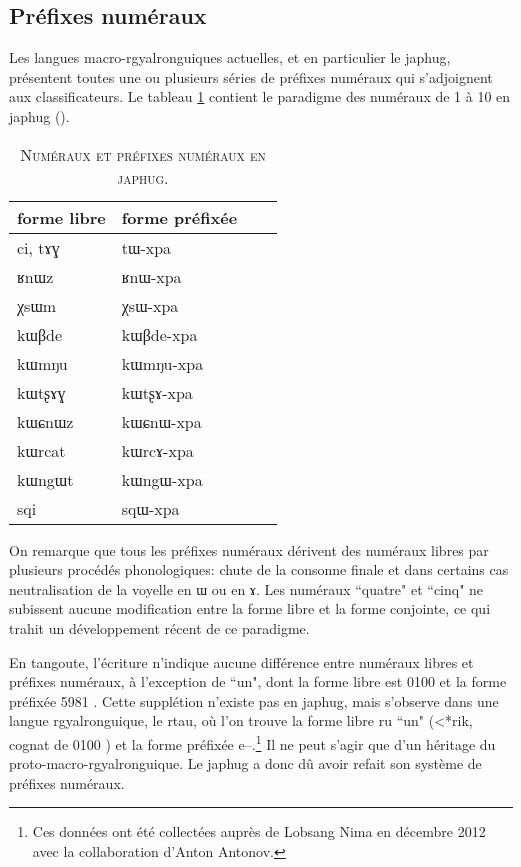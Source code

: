 \documentclass[oldfontcommands,twoside,a4paper,11pt,draft]{memoir}
\newcommand{\ipa}[1]{{\phon #1}} %
\newcommand{\captionb}[1]{\caption{\textsc{#1}}}
\newcommand{\tgz}[1]{#1 \mo{#1} \tg{#1}}
\begin{document}
\subsection{Préfixes numéraux} \label{subsec:num} 
Les langues macro-rgyalronguiques actuelles, et en particulier le japhug, présentent toutes une ou plusieurs séries de préfixes numéraux qui s'adjoignent aux classificateurs. Le tableau \ref{tab:num} contient  le paradigme des numéraux de 1 à 10 en japhug (\citealt[191]{jacques08zh}). 
\begin{table} 
\captionb{Numéraux et préfixes numéraux en japhug.}\label{tab:num} \centering
\begin{tabular}{llll}
\toprule
forme libre & forme préfixée\\
\midrule
\ipa{ci}, \ipa{tɤɣ} & \ipa{tɯ-xpa} \\
\ipa{ʁnɯz} & \ipa{ʁnɯ-xpa} \\
\ipa{χsɯm} & \ipa{χsɯ-xpa} \\
\ipa{kɯβde} & \ipa{kɯβde-xpa} \\
\ipa{kɯmŋu} & \ipa{kɯmŋu-xpa} \\
\ipa{kɯtʂɤɣ} & \ipa{kɯtʂɤ-xpa} \\
\ipa{kɯɕnɯz} & \ipa{kɯɕnɯ-xpa} \\
\ipa{kɯrcat} & \ipa{kɯrcɤ-xpa} \\
\ipa{kɯngɯt} & \ipa{kɯngɯ-xpa} \\
\ipa{sqi} & \ipa{sqɯ-xpa} \\
\bottomrule
\end{tabular}
\end{table}
On remarque que tous les préfixes numéraux dérivent des numéraux libres par plusieurs procédés phonologiques: chute de la consonne finale et dans certains cas neutralisation de la voyelle en \ipa{ɯ} ou en \ipa{ɤ}. Les numéraux ``quatre" et ``cinq" ne subissent aucune modification entre la forme libre et la forme conjointe, ce qui trahit un développement récent de ce paradigme.

En tangoute,   l'écriture n'indique aucune différence entre numéraux libres et préfixes numéraux, à l'exception de ``un", dont la forme libre est  \tgz{0100}	 et la forme préfixée \tgz{5981}. Cette supplétion n'existe pas en japhug, mais s'observe dans une langue rgyalronguique, le rtau, où l'on trouve la forme libre \ipa{ru} ``un" (<*rik, cognat de \tgz{0100}) et la forme préfixée \ipa{e}--.\footnote{Ces données ont été collectées auprès de Lobsang Nima en décembre 2012 avec la collaboration d'Anton Antonov.} Il ne peut s'agir que d'un héritage du proto-macro-rgyalronguique. Le japhug a donc dû avoir refait son système de préfixes numéraux.
\end{document}
